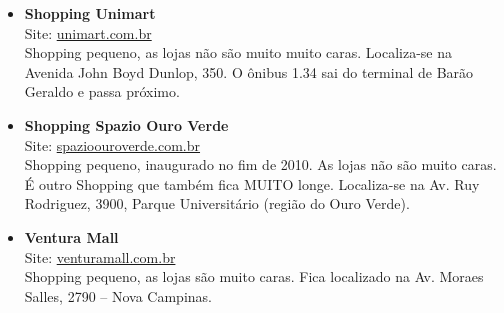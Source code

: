 \begin{itemize}
\item \textbf{Shopping Unimart}
  \\Site: \url{unimart.com.br}
  \\Shopping pequeno, as lojas não são muito muito caras. Localiza-se na
  Avenida John Boyd Dunlop, 350. O ônibus 1.34 sai do terminal de Barão Geraldo
  e passa próximo.

\item \textbf{Shopping Spazio Ouro Verde}
  \\Site: \url{spazioouroverde.com.br}
  \\Shopping pequeno, inaugurado no fim de 2010. As lojas não são muito caras.
  É outro Shopping que também fica MUITO longe. Localiza-se na Av. Ruy
  Rodriguez, 3900, Parque Universitário (região do Ouro Verde).

\item \textbf{Ventura Mall}
  \\Site: \url{venturamall.com.br}
  \\Shopping pequeno, as lojas são muito caras. Fica localizado na Av. Moraes
  Salles, 2790 -- Nova Campinas.
\end{itemize}
